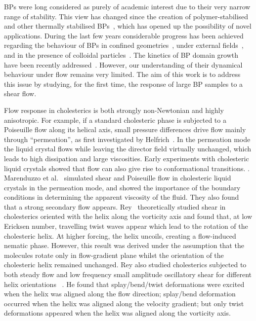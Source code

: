 \documentclass[8.5pt,twoside,twocolumn]{article}
\begin{document}
BPs were long considered as purely of academic interest due to their very narrow 
range of stability. This view has changed since the creation of polymer-stabilised and other thermally 
stabilised BPs~\cite{Kikuchi:2002,Coles:2005}, which has opened up the 
possibility of novel applications.
During the last few years considerable progress has been achieved regarding the behaviour 
of BPs in confined geometries~\cite{Fukuda:2010a, Fukuda:2010b, Ravnik:2011b}, under 
external fields~\cite{Alexander:2008,Fukuda:2009,Henrich:2010a,Castles:2010,Tiribocchi:2011a}, 
and in the presence of colloidal particles~\cite{Ravnik:2011a}.
The kinetics of BP domain growth have been recently addressed~\cite{Henrich:2010b}. 
However, our understanding of their dynamical behaviour under flow remains
very limited. The aim of this work is to address this issue by studying,
for the first time, the response of large BP samples to a shear flow.

Flow response in cholesterics is both strongly non-Newtonian and highly anisotropic.
For example, if a standard cholesteric phase is subjected to a Poiseuille flow along
its helical axis, small pressure differences drive flow mainly through
``permeation'', as first investigated by Helfrich~\cite{Helfrich:1969}.
In the permeation mode the liquid crystal flows while leaving the director
field virtually unchanged, which leads to high dissipation and large
viscosities. 
Early experiments with cholesteric liquid crystals
showed that flow can also give rise to conformational transitions. \cite{Press:1978}.
Marenduzzo et al.~\cite{Marenduzzo:2006a,Marenduzzo:2006b} simulated 
shear and Poiseuille flow in cholesteric liquid crystals in the permeation mode, and 
showed the importance of the boundary conditions in determining the apparent viscosity of the fluid. 
They also found that a strong secondary flow appears.
Rey~\cite{Rey:1996a, Rey:1996b} theoretically studied shear in cholesterics oriented with the helix along 
the vorticity axis and found that, at low Ericksen number, travelling twist waves appear which 
lead to the rotation of the cholesteric helix. At higher forcing, the helix uncoils, creating a flow-induced nematic phase. 
However, this result was derived under the 
assumption that the molecules rotate only in flow-gradient plane whilst
the orientation of the cholesteric helix remained unchanged.
Rey also studied cholesterics subjected to both steady flow and low frequency
small amplitude oscillatory shear for different helix orientations
~\cite{Rey:2000, Rey:2002}. He found that splay/bend/twist deformations were
excited when the helix was aligned along the flow direction; splay/bend
deformation occurred when the helix was aligned along the velocity gradient;
but only twist deformations
appeared when the helix was aligned along the vorticity axis.
\end{document}
